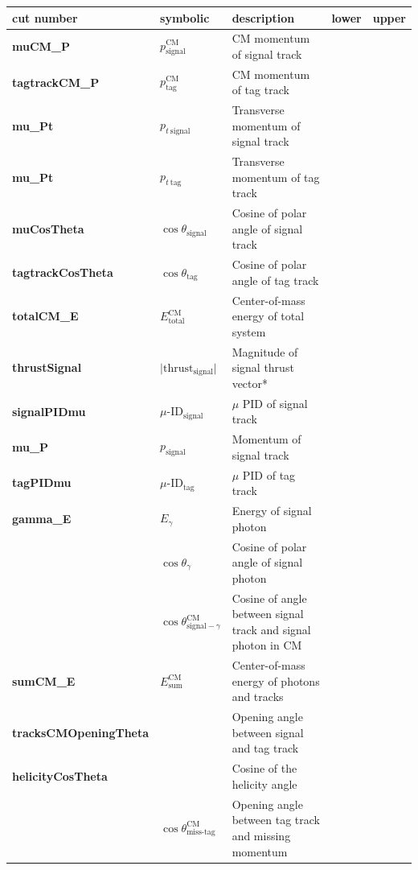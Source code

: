 \documentclass[12pt]{thesis}  %
\begin{document}
\begin{table}[h]
\centering
\begin{tabular}{lllll}
\textbf{cut number} & \textbf{symbolic} & \textbf{description} & \textbf{lower} & \textbf{upper} \\ \hline
\textbf{muCM\_P} & $p_{\text{signal}}^{\text{CM}}$  & CM momentum of signal track  &  &  \\
\textbf{tagtrackCM\_P} & $p_{\text{tag}}^{\text{CM}}$  & CM momentum of tag track &  &  \\
\textbf{mu\_Pt} & $p_{t~\text{signal}}$ & Transverse momentum of signal track &  &  \\
\textbf{mu\_Pt} & $p_{t~\text{tag}}$ & Transverse momentum of tag track &  &  \\
\textbf{muCosTheta} & $\cos\theta_{\text{signal}}$ & Cosine of polar angle of signal track &  &  \\
\textbf{tagtrackCosTheta} & $\cos\theta_{\text{tag}}$ & Cosine of polar angle of tag track &  &  \\
\textbf{totalCM\_E} & $E_{\text{total}}^{\text{CM}}$ & Center-of-mass energy of total system  &  &  \\
\textbf{thrustSignal} & $\lvert\text{thrust}_{\text{signal}}\rvert$ & Magnitude of signal thrust vector* &  &  \\
\textbf{signalPIDmu} & $\mu\text{-ID}_{\text{signal}}$ & $\mu$ PID of signal track &  &  \\
\textbf{mu\_P} & $p_{\text{signal}}$  & Momentum of signal track &  &  \\
\textbf{tagPIDmu} & $\mu\text{-ID}_{\text{tag}}$ & $\mu$ PID of tag track &  &  \\
\textbf{gamma\_E} & $E_{\gamma}$ & Energy of signal photon &  &  \\
 & $\cos\theta_{\gamma}$ & Cosine of polar angle of signal photon &  &  \\
 & $\cos\theta^{\text{CM}}_{\text{signal}-\gamma}$ & Cosine of angle between signal track and signal photon in CM &  &  \\
\textbf{sumCM\_E} & $E_{\text{sum}}^{\text{CM}}$ & Center-of-mass energy of photons and tracks &  &  \\
\textbf{tracksCMOpeningTheta} &  & Opening angle between signal and tag track &  &  \\
\textbf{helicityCosTheta} &  & Cosine of the helicity angle &  &  \\
 & $\cos\theta^{\text{CM}}_{\text{miss-tag}}$ & Opening angle between tag track and missing momentum &  &  \\

\end{tabular}
\end{table}
\end{document}
